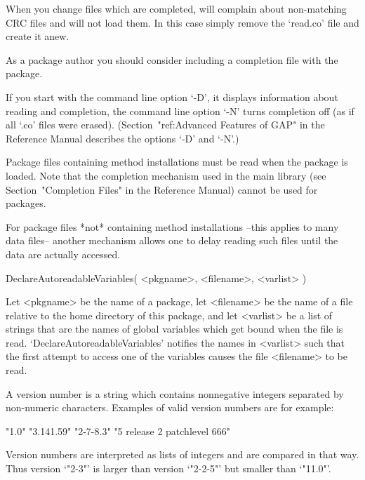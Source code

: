When you change files which are completed, {\GAP} will complain about
non-matching CRC files and will not load them.
In this case simply remove the `read.co' file and create it anew.

As a {\GAP} package author you should consider including a completion file
with the package.

If you start {\GAP} with the command line option `-D', it displays
information about reading and completion, the command line option `-N' turns
completion off (as if all `.co' files were erased).
(Section~"ref:Advanced Features of GAP" in the {\GAP} Reference Manual
describes the options `-D' and `-N'.)



Package files containing method installations must be read
when the package is loaded.
Note that the completion mechanism used in the main {\GAP} library
(see Section~"Completion Files" in the {\GAP} Reference Manual)
cannot be used for packages.

For package files *not* containing method installations
--this applies to many data files--
another mechanism allows one to delay reading such files
until the data are actually accessed.

\>DeclareAutoreadableVariables( <pkgname>, <filename>, <varlist> )

Let <pkgname> be the name of a package, let <filename> be the name of
a file relative to the home directory of this package,
and let <varlist> be a list of strings that are the names of global
variables which get bound when the file is read.
`DeclareAutoreadableVariables' notifies the names in <varlist>
such that the first attempt to access one of the variables
causes the file <filename> to be read.



A version number is a string which contains nonnegative integers separated
by non-numeric characters. Examples of valid version numbers are for
example:

\begintt
"1.0"   "3.141.59"  "2-7-8.3" "5 release 2 patchlevel 666"
\endtt

Version numbers are interpreted as  lists of integers and are compared
in that way. Thus version `"2-3"' is larger than version `"2-2-5"' but
smaller than `"11.0"'.

